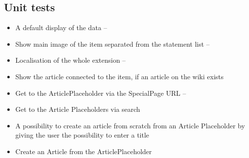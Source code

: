 \documentclass[11pt]{article}
\begin{document}
\subsection {Unit tests}



\begin{itemize}
\item A default display of the data -- 
\item Show main image of the item separated from the statement list -- 
\item Localisation of the whole extension -- 
\item Show the article connected to the item, if an article on the wiki exists
\item Get to the ArticlePlaceholder via the SpecialPage URL --
\item Get to the Article Placeholders via search
\item A possibility to create an article from scratch from an Article Placeholder by giving the user the possibility to enter a title

\item Create an Article from the ArticlePlaceholder
\end{itemize} 
 
\end{document}
